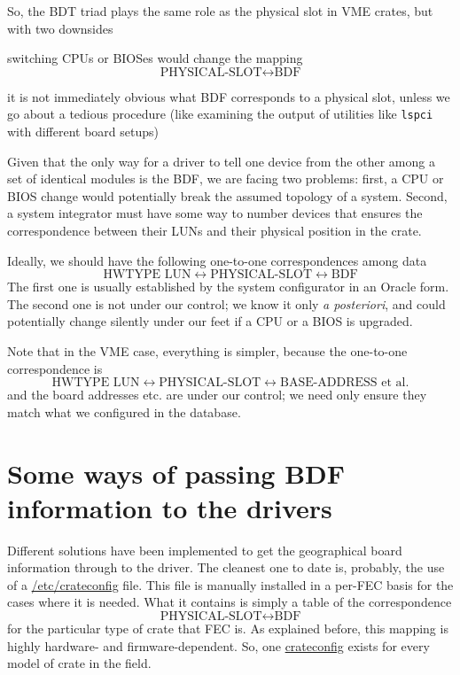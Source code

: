 \documentclass[12pt,a4paper]{article}
\newcommand\fname[1]{\texttt{#1}}
\begin{document}
So, the BDT triad plays the same role as the physical slot in VME
crates, but with two downsides
\begin{compactitem}
\item switching CPUs or BIOSes would change the mapping
\begin{equation*}
\text{PHYSICAL-SLOT} \leftrightarrow \text{BDF}
\end{equation*}
\item it is not immediately obvious what BDF corresponds to a physical
slot, unless we go about a tedious procedure (like examining the
output of utilities like \fname{lspci} with different board setups)
\end{compactitem}
Given that the only way for a driver to tell one device from the other
among a set of identical modules is the BDF, we are facing two problems:
first, a CPU or BIOS change would potentially break the assumed topology
of a system. Second, a system integrator must have some way to number
devices that ensures the correspondence between their LUNs and their
physical position in the crate.

Ideally, we should have the following one-to-one correspondences among data
\begin{equation*}
	\text{HWTYPE LUN} \leftrightarrow
	\text{PHYSICAL-SLOT} \leftrightarrow
	\text{BDF}
\end{equation*}
The first one is usually established by the system configurator in an
Oracle form. The second one is not under our control; we know it only
\emph{a posteriori}, and could potentially change silently
under our feet if a CPU or a BIOS is upgraded.

Note that in the VME case, everything is simpler, because the one-to-one
correspondence is
\begin{equation*}
	\text{HWTYPE LUN} \leftrightarrow
	\text{PHYSICAL-SLOT} \leftrightarrow
	\text{BASE-ADDRESS et al.}
\end{equation*}
and the board addresses etc. are under our control; we need only ensure
they match what we configured in the database.

\section{Some ways of passing BDF information to the drivers}
\label{crateconfigs}

Different solutions have been implemented to get the geographical board
information through to the driver. The cleanest one to date is,
probably, the use of a \url{/etc/crateconfig} file. This file is
manually installed in a per-FEC basis for the cases where it is needed.
What it contains is simply a table of the correspondence
\begin{equation*}
	\text{PHYSICAL-SLOT} \leftrightarrow \text{BDF}
\end{equation*}
for the particular type of crate that FEC is. As explained before, this
mapping is highly hardware- and firmware-dependent. So, one
\url{crateconfig} exists for every model of crate in the field.
\end{document}
